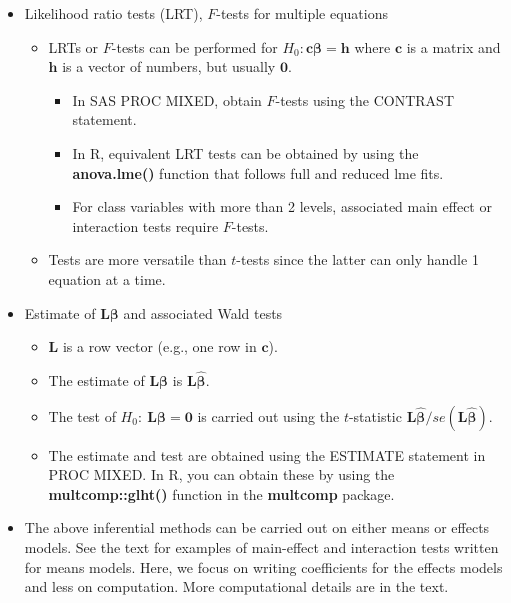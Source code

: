 \documentclass[
  9pt,
  ignorenonframetext,
]{beamer}
\providecommand{\tightlist}{%
  \setlength{\itemsep}{0pt}\setlength{\parskip}{0pt}}
\begin{document}
\begin{frame}{}
\protect\hypertarget{section-2}{}
\begin{itemize}
\item
  Likelihood ratio tests (LRT), \(F\)-tests for multiple equations

  \begin{itemize}
  \tightlist
  \item
    LRTs or \(F\)-tests can be performed for
    \(H_0: \pmb {c\beta} = \pmb h\) where \(\pmb c\) is a matrix and
    \(\pmb h\) is a vector of numbers, but usually \(\pmb 0\).

    \begin{itemize}
    \tightlist
    \item
      In SAS PROC MIXED, obtain \(F\)-tests using the CONTRAST
      statement.
    \item
      In R, equivalent LRT tests can be obtained by using the
      \textbf{anova.lme()} function that follows full and reduced lme
      fits.
    \item
      For class variables with more than 2 levels, associated main
      effect or interaction tests require \(F\)-tests.
    \end{itemize}
  \item
    Tests are more versatile than \(t\)-tests since the latter can only
    handle 1 equation at a time.
  \end{itemize}
\item
  Estimate of \(\pmb {L\beta}\) and associated Wald tests

  \begin{itemize}
  \tightlist
  \item
    \(\pmb L\) is a row vector (e.g., one row in \(\pmb c\)).
  \item
    The estimate of \(\pmb {L\beta}\) is \(\pmb {L \hat \beta}\).
  \item
    The test of \(H_0:\  \pmb{L\beta} = \pmb 0\) is carried out using
    the \(t\)-statistic \(\pmb {L\hat \beta}/se(\pmb {L\hat \beta})\).
  \item
    The estimate and test are obtained using the ESTIMATE statement in
    PROC MIXED. In R, you can obtain these by using the
    \textbf{multcomp::glht()} function in the \textbf{multcomp} package.
  \end{itemize}
\item
  The above inferential methods can be carried out on either means or
  effects models. See the text for examples of main-effect and
  interaction tests written for means models. Here, we focus on writing
  coefficients for the effects models and less on computation. More
  computational details are in the text.
\end{itemize}
\end{frame}
\end{document}

